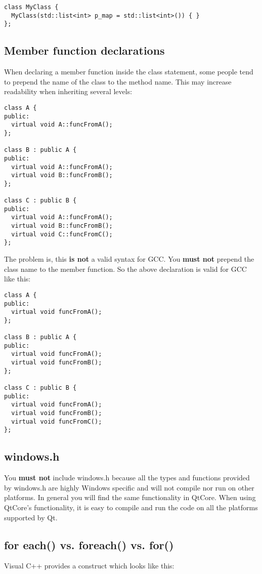 \begin{verbatim}
class MyClass {
  MyClass(std::list<int> p_map = std::list<int>()) { }
};
\end{verbatim}

\subsection{Member function declarations} When declaring a member function inside the class statement, some people tend to prepend the name of the class to the method name. This may increase readability when inheriting several levels:
\begin{verbatim}
class A {
public:
  virtual void A::funcFromA();
};

class B : public A {
public:
  virtual void A::funcFromA();
  virtual void B::funcFromB();
};

class C : public B {
public:
  virtual void A::funcFromA();
  virtual void B::funcFromB();
  virtual void C::funcFromC();
};
\end{verbatim}

The problem is, this \textbf{is not} a valid syntax for GCC. You \textbf{must not} prepend the class name to the member function. So the above declaration is valid for GCC like this:

\begin{verbatim}
class A {
public:
  virtual void funcFromA();
};

class B : public A {
public:
  virtual void funcFromA();
  virtual void funcFromB();
};

class C : public B {
public:
  virtual void funcFromA();
  virtual void funcFromB();
  virtual void funcFromC();
};
\end{verbatim}

\subsection{windows.h} You \textbf{must not} include windows.h because all the types and functions provided by windows.h are highly Windows specific and will not compile nor run on other platforms. In general you will find the same functionality in QtCore. When using QtCore's functionality, it is easy to compile and run the code on all the platforms supported by Qt.

\subsection{for each() vs. foreach() vs. for()} Visual C++ provides a construct which looks like this:

